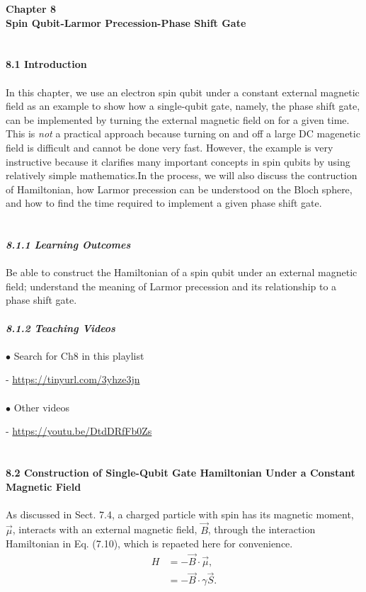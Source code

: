 \documentclass{article}
\newcommand{\bfit}[1]{\textit{\textbf{#1}}}
\begin{document}
\textbf{\Large Chapter 8\\ Spin Qubit-Larmor Precession-Phase Shift Gate}\\\\\\
\textbf{8.1 Introduction}\\\\
In this chapter, we use an electron spin qubit under a constant external magnetic
field as an example to show how a single-qubit gate, namely, the phase shift gate,
can be implemented by turning the external magnetic field on for a given time.
This is \textit{not} a practical approach because turning on and off a large DC magenetic
field is difficult and cannot be done very fast. However, the example is very instructive
because it clarifies many important concepts in spin qubits by using relatively simple
mathematics.In the process, we will also discuss the contruction of Hamiltonian,
how Larmor precession can be understood on the Bloch sphere, and how to find the time
required to implement a given phase shift gate.\\\\\\
\bfit{\large 8.1.1 Learning Outcomes}\\\\
Be able to construct the Hamiltonian of a spin qubit under an external
magnetic field; understand the meaning of Larmor precession and its relationship
to a phase shift gate.\\\\
\bfit{8.1.2 Teaching Videos}\\\\
$\bullet$ Search for Ch8 in this playlist

- \url{https://tinyurl.com/3yhze3jn}\\\\
$\bullet$ Other videos

- \url{https://youtu.be/DtdDRfFb0Zs}\\\\\\
\textbf{\large 8.2 Construction of Single-Qubit Gate Hamiltonian Under a Constant Magnetic Field}\\\\
As discussed in Sect. 7.4, a charged particle with spin has its magnetic moment,
$\vec{\mu}$, interacts with an external magnetic field, $\vec{B}$, through the interaction
Hamiltonian in Eq. (7.10), which is repaeted here for convenience.
\begin{align*}\label{eq 8.1}
    H&=-\vec{B}\cdot\vec{\mu},\\
    &=-\vec{B}\cdot\gamma\vec{S}.\tag{8.1}
\end{align*}
\end{document}
